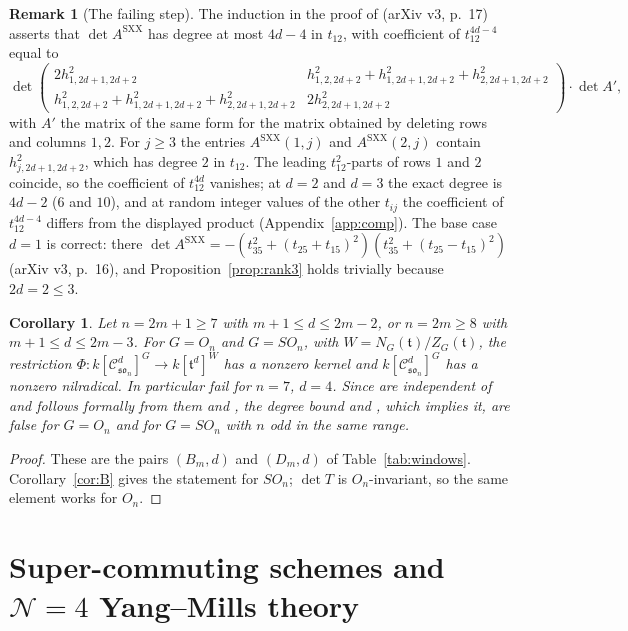 \documentclass[11pt]{article}
\newtheorem{corollary}[theorem]{Corollary}
\theoremstyle{definition}
\newtheorem{remark}[theorem]{Remark}
\newcommand{\h}{\mathfrak t}
\newcommand{\Cs}{\mathcal C}
\newcommand{\Asxx}{A^{\mathrm{SXX}}}
\begin{document}
\begin{remark}[The failing step]\label{rem:step}
The induction in the proof of \cite[Lemma~5.2]{SXX23} (arXiv v3, p.~17) asserts that $\det\Asxx$ has degree at most $4d-4$ in $t_{12}$, with coefficient of $t_{12}^{4d-4}$ equal to
\[
\det\begin{pmatrix}2h^2_{1,2d+1,2d+2}&h^2_{1,2,2d+2}+h^2_{1,2d+1,2d+2}+h^2_{2,2d+1,2d+2}\\ h^2_{1,2,2d+2}+h^2_{1,2d+1,2d+2}+h^2_{2,2d+1,2d+2}&2h^2_{2,2d+1,2d+2}\end{pmatrix}\cdot\det A' ,
\]
with $A'$ the matrix of the same form for the matrix obtained by deleting rows and columns $1,2$. For $j\ge3$ the entries $\Asxx(1,j)$ and $\Asxx(2,j)$ contain $h^2_{j,2d+1,2d+2}$, which has degree $2$ in $t_{12}$. The leading $t_{12}^2$-parts of rows $1$ and $2$ coincide, so the coefficient of $t_{12}^{4d}$ vanishes; at $d=2$ and $d=3$ the exact degree is $4d-2$ ($6$ and $10$), and at random integer values of the other $t_{ij}$ the coefficient of $t_{12}^{4d-4}$ differs from the displayed product (Appendix~\ref{app:comp}). The base case $d=1$ is correct: there $\det\Asxx=-(t_{35}^2+(t_{25}+t_{15})^2)(t_{35}^2+(t_{25}-t_{15})^2)$ (arXiv v3, p.~16), and Proposition~\ref{prop:rank3} holds trivially because $2d=2\le3$.
\end{remark}

\begin{corollary}\label{cor:SXX}
Let $n=2m+1\ge7$ with $m+1\le d\le2m-2$, or $n=2m\ge8$ with $m+1\le d\le2m-3$. For $G=O_n$ and $G=SO_n$, with $W=N_G(\h)/Z_G(\h)$, the restriction $\Phi:k[\Cs^d_{\mathfrak{so}_n}]^G\to k[\h^d]^W$ has a nonzero kernel and $k[\Cs^d_{\mathfrak{so}_n}]^G$ has a nonzero nilradical. In particular \cite[Thm.~1.2(1), Cor.~1.3]{SXX23} fail for $n=7$, $d=4$. Since \cite[Prop.~3.1, Lemma~3.2]{SXX23} are independent of \cite[\S5.2]{SXX23} and \cite[Thm.~3.4]{SXX23} follows formally from them and \cite[Lemma~3.3]{SXX23}, the degree bound \cite[Lemma~3.3]{SXX23} and \cite[Lemma~5.3]{SXX23}, which implies it, are false for $G=O_n$ and for $G=SO_n$ with $n$ odd in the same range.
\end{corollary}
\begin{proof}
These are the pairs $(B_m,d)$ and $(D_m,d)$ of Table~\ref{tab:windows}. Corollary~\ref{cor:B} gives the statement for $SO_n$; $\det T$ is $O_n$-invariant, so the same element works for $O_n$.
\end{proof}

\section{Super-commuting schemes and $\mathcal N=4$ Yang--Mills theory}\label{sec:N4}
\end{document}
